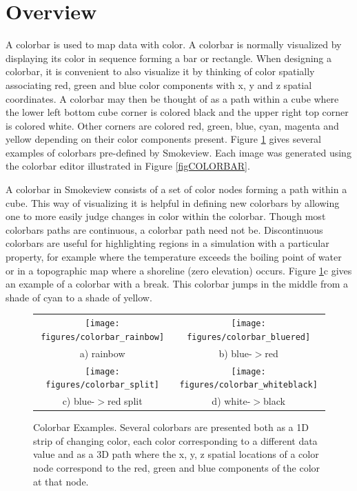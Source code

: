 \documentclass[11pt,twoside]{book}
\newcommand{\figoptions}{hbp}
\begin{document}
\section{Overview}
A colorbar is used to map
data with color.  A colorbar is normally visualized by
displaying its color in sequence forming a bar or rectangle.
When designing a colorbar, it is convenient to also visualize it
by thinking of color spatially associating red, green and
blue color components with x, y and z spatial coordinates.  A colorbar
may then be thought of as a path within a cube where the lower left bottom
cube corner is colored black and the upper right top corner is colored
white.  Other corners are colored red, green, blue, cyan, magenta and
yellow depending on their color components present.
Figure \ref{figCOLORBAR_EXAMPLES} gives several examples of colorbars pre-defined
by Smokeview.  Each image was generated using the colorbar editor
illustrated in Figure \ref{figCOLORBAR}.

A colorbar in Smokeview consists of a set of color nodes forming a path
within a cube.  This way of visualizing it is helpful in defining new
colorbars by allowing one to more easily judge changes in color within the
colorbar.  Though most colorbars paths are continuous, a colorbar
path need not be.  Discontinuous colorbars
are useful for highlighting regions in a simulation with a particular
property, for example where the temperature exceeds the boiling point of
water or in a topographic map where a shoreline (zero elevation) occurs.
Figure \ref{figCOLORBAR_EXAMPLES}c
gives an example of a colorbar with a break.  This colorbar jumps in the
middle from a shade of cyan to a shade of yellow.


\begin{figure}[\figoptions]
\begin{center}
\begin{tabular}{cc}
\texttt{[image: figures/colorbar\_rainbow]}&
\texttt{[image: figures/colorbar\_bluered]}\\
a) rainbow&b) blue-$>$red\\
\texttt{[image: figures/colorbar\_split]}&
\texttt{[image: figures/colorbar\_whiteblack]}\\
c) blue-$>$red split&d) white-$>$black
\end{tabular}
\end{center}
\caption[Colorbar Examples]{
Colorbar Examples.  Several colorbars are presented both as a 1D strip
of changing color, each color corresponding to a different data value and as a 3D path where the x, y, z spatial locations
of a color node correspond to the red, green and blue components of the color at that node.} \label{figCOLORBAR_EXAMPLES}
\end{figure}
\end{document}
